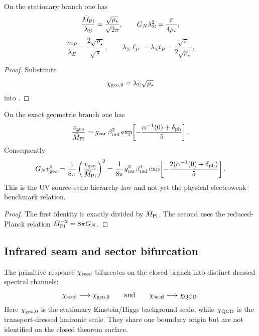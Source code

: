 \begin{corollary}
\label{cor:dimensionless-planck-metrology}
On the stationary branch one has
\[
\frac{\bar M_{\mathrm{Pl}}}{\lambda_\Sigma}
=
\frac{\sqrt{\rho_\star}}{\sqrt2\pi},
\qquad
G_N\lambda_\Sigma^2
=
\frac{\pi}{4\rho_\star},
\]
\[
\frac{m_P}{\lambda_\Sigma}
=
\frac{2\sqrt{\rho_\star}}{\sqrt\pi},
\qquad
\lambda_\Sigma\ell_P=\lambda_\Sigma t_P
=
\frac{\sqrt\pi}{2\sqrt{\rho_\star}}.
\]
\end{corollary}

\begin{proof}
Substitute
\[
\chi_{\mathrm{geo},0}=\lambda_\Sigma\sqrt{\rho_\star}
\]
into .
\end{proof}

\begin{corollary}
\label{cor:dimensionless-geometric-hierarchy}
On the exact geometric branch one has
\[
\frac{v_{\mathrm{geo}}}{\bar M_{\mathrm{Pl}}}
=
g_{\mathrm{car}}\,\beta_{\mathrm{rad}}^2
\exp\!\left[-\frac{\alpha^{-1}(0)+\delta_{\mathrm{ph}}}{5}\right].
\]
Consequently
\[
G_Nv_{\mathrm{geo}}^2
=
\frac{1}{8\pi}
\left(\frac{v_{\mathrm{geo}}}{\bar M_{\mathrm{Pl}}}\right)^2
=
\frac{1}{8\pi}g_{\mathrm{car}}^2\beta_{\mathrm{rad}}^4
\exp\!\left[-\frac{2(\alpha^{-1}(0)+\delta_{\mathrm{ph}})}{5}\right].
\]
This is the UV source-scale hierarchy law and not yet the physical electroweak benchmark relation.
\end{corollary}

\begin{proof}
The first identity is exactly  divided by $\bar M_{\mathrm{Pl}}$. The second uses the
reduced-Planck relation $\bar M_{\mathrm{Pl}}^{-2}=8\pi G_N$.
\end{proof}

\subsection{Infrared seam and sector bifurcation}

\begin{theorem}
\label{thm:sector-dressed-spectral-scale-bifurcation}
The primitive response $\chi_{\mathrm{seed}}$ bifurcates on the closed branch into distinct dressed spectral
channels:
\[
\chi_{\mathrm{seed}}\longrightarrow \chi_{\mathrm{geo},0}
\qquad\text{and}\qquad
\chi_{\mathrm{seed}}\longrightarrow \chi_{\mathrm{QCD}}.
\]
Here $\chi_{\mathrm{geo},0}$ is the stationary Einstein/Higgs background scale, while $\chi_{\mathrm{QCD}}$ is the
transport-dressed hadronic scale. They share one boundary origin but are not identified on the
closed theorem surface.
\end{theorem}

